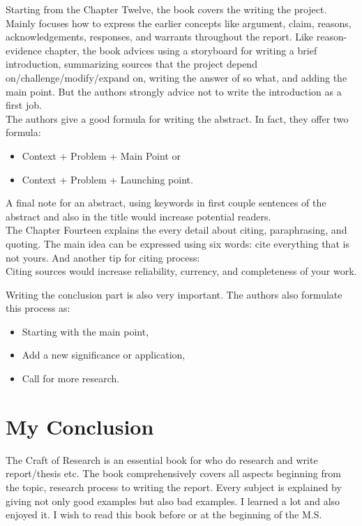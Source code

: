 \documentclass[11pt]{article} %
\begin{document}
Starting from the Chapter Twelve, the book covers the writing the project. Mainly focuses how to express the earlier concepts like argument, claim, reasons, acknowledgements, responses, and warrants throughout the report. Like reason-evidence chapter, the book advices using a storyboard for writing a brief introduction, summarizing sources that the project depend on/challenge/modify/expand on, writing the answer of so what, and adding the main point. But the authors strongly advice not to write the introduction as a first job. \\

The authors give a good formula for writing the abstract. In fact, they offer two formula:\\

	\begin{itemize}
		\item Context + Problem + Main Point or
		\item Context + Problem + Launching point.
	\end{itemize}

A final note for an abstract, using keywords in first couple sentences of the abstract and also in the title would increase potential readers. \\

The Chapter Fourteen explains the every detail about citing, paraphrasing, and quoting. The main idea can be expressed using six words: cite everything that is not yours. And another tip for citing process: \\
	\center Citing sources would increase reliability, currency, and completeness of your work. 

\vspace{0.9 cm}
\justifying Writing the conclusion part is also very important. The authors also formulate this process as:\\

	\begin{itemize}
		\item Starting with the main point,
		\item Add a new significance or application,
		\item Call for more research.
	\end{itemize}
	
\section{My Conclusion}
	The Craft of Research is an essential book for who do research and write report/thesis etc.  The book comprehensively covers all aspects beginning from the topic, research process to writing the report. Every subject is explained by giving not only good examples but also bad examples. I learned a lot and also enjoyed it. I wish to read this book before or at the beginning of the M.S. 
	
\end{document}
